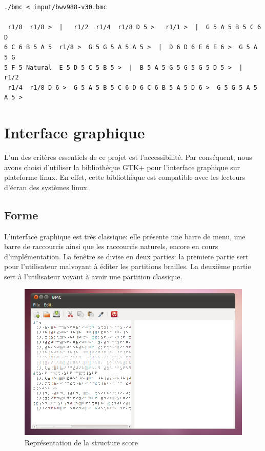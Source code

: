 \begin{verbatim}
./bmc < input/bwv988-v30.bmc 

 r1/8  r1/8 >  |   r1/2  r1/4  r1/8 D 5 >   r1/1 >  |  G 5 A 5 B 5 C 6 D 
6 C 6 B 5 A 5  r1/8 >  G 5 G 5 A 5 A 5 >  |  D 6 D 6 E 6 E 6 >  G 5 A 5 G 
5 F 5 Natural  E 5 D 5 C 5 B 5 >  |  B 5 A 5 G 5 G 5 G 5 D 5 >  |   r1/2 
 r1/4  r1/8 D 6 >  G 5 A 5 B 5 C 6 D 6 C 6 B 5 A 5 D 6 >  G 5 G 5 A 5 A 5 > 
\end{verbatim}

\section{Interface graphique}

L'un des critères essentiels de ce projet est l'accessibilité. Par
conséquent, nous avons choisi d'utiliser la bibliothèque GTK+ pour
l'interface graphique sur plateforme linux. En effet, cette
bibliothèque est compatible avec les lecteurs d'écran des systèmes
linux.


\subsection*{Forme}
L'interface graphique est très classique: elle présente une barre de
menu, une barre de raccourcis ainsi que les raccourcis naturels,
encore en cours d'implémentation. La fenêtre se divise en deux
parties: la premiere partie sert pour l'utilisateur malvoyant à éditer les partitions brailles. La
deuxième partie sert à l'utilisateur voyant à avoir une partition
classique.

\begin{center}
\begin{figure}[!h]
  \includegraphics[scale=0.65]{images/linux_gui.png}
  \caption{Représentation de la structure score}
\end{figure}
\end{center}



